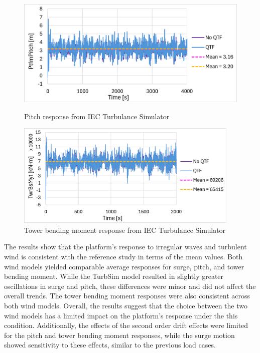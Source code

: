 \documentclass[a4paper, 11pt]{article}
\begin{document}
\begin{figure}[H]
    \begin{minipage}{0.48\textwidth}
        \centering
        \includegraphics[width=1\textwidth]{3.2_iec_pitch.png}
        \caption{\small Pitch response from IEC Turbulance Simulator}
        \label{fig:3.2_iec_pitch}
    \end{minipage}
    \hfill
    \begin{minipage}{0.5\textwidth}
        \centering
        \includegraphics[width=0.95\textwidth]{3.2_iec_twr.png}
        \caption{\small Tower bending moment response from IEC Turbulance Simulator}
        \label{fig:3.2_iec_twr}
    \end{minipage}
\end{figure}

The results show that the platform's response to irregular waves and turbulent wind is consistent with the reference study in terms of the mean values. Both wind models yielded comparable average responses for surge, pitch, and tower bending moment. While the TurbSim model resulted in slightly greater oscillations in surge and pitch, these differences were minor and did not affect the overall trends. The tower bending moment responses were also consistent across both wind models. Overall, the results suggest that the choice between the two wind models has a limited impact on the platform’s response under the this condition. 
Additionally, the effects of the second order drift effects were limited for the pitch and tower bending moment responses, while the surge motion showed sensitivity to these effects, similar to the previous load cases. 
\end{document}
